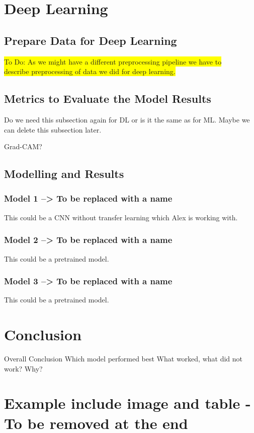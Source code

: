 \documentclass{article}
\begin{document}
\section{Deep Learning}

\subsection{Prepare Data for Deep Learning}
\colorbox{yellow}{To Do: As we might have a different preprocessing pipeline we have to }\\
\colorbox{yellow}{describe preprocessing of data we did for deep learning.}\\

\subsection{Metrics to Evaluate the Model Results}
Do we need this subsection again for DL or is it the same as for ML. 
Maybe we can delete this subsection later.

Grad-CAM?

\subsection{Modelling and Results}
\subsubsection{Model 1 --> To be replaced with a name}
This could be a CNN without transfer learning which Alex is working with. 

\subsubsection{Model 2 --> To be replaced with a name}
This could be a pretrained model.

\subsubsection{Model 3 --> To be replaced with a name}
This could be a pretrained model.


\section{Conclusion}

Overall Conclusion
Which model performed best
What worked, what did not work? Why?

\section{Example include image and table - To be removed at the end}
\end{document}
